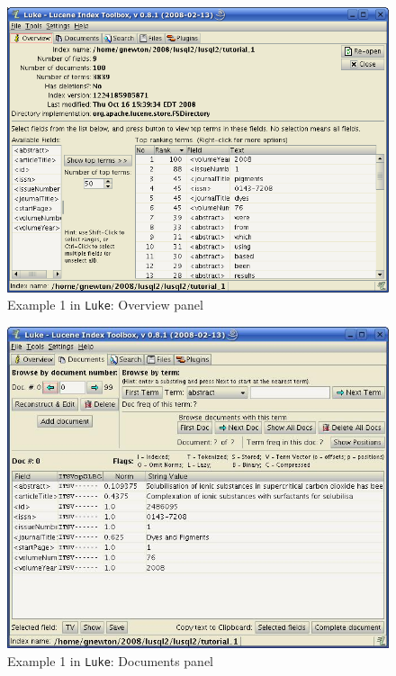   \begin{figure}
  \begin{center}
 \includegraphics[width=\textwidth]{images/luke_1_1.png}
      \end{center}
  \caption{Example 1 in {\tt Luke}: Overview panel}
\label{luke_1_1}
\end{figure}

\begin{figure}
  \begin{center}
  \includegraphics[width=\textwidth]{images/luke_1_2.png}
      \end{center}
  \caption{Example 1 in {\tt Luke}: Documents panel}
\label{luke_1_2}
\end{figure}

